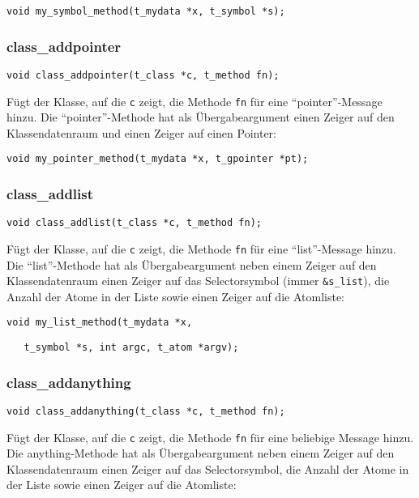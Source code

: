 \documentclass[12pt, a4paper,austrian, titlepage]{article}
\begin{document}
\begin{appendix}
\verb+void my_symbol_method(t_mydata *x, t_symbol *s);+

\subsubsection{class\_addpointer}
\begin{verbatim}
void class_addpointer(t_class *c, t_method fn);
\end{verbatim}
Fügt der Klasse, auf die \verb+c+ zeigt, die Methode \verb+fn+ 
für eine ``pointer''-Message hinzu.
Die ``pointer''-Methode hat als Übergabeargument einen Zeiger
auf den Klassendatenraum und einen Zeiger auf einen Pointer:

\verb+void my_pointer_method(t_mydata *x, t_gpointer *pt);+

\subsubsection{class\_addlist}
\begin{verbatim}
void class_addlist(t_class *c, t_method fn);
\end{verbatim}
Fügt der Klasse, auf die \verb+c+ zeigt, die Methode \verb+fn+ 
für eine ``list''-Message hinzu.
Die ``list''-Methode hat als Übergabeargument neben einem Zeiger
auf den Klassendatenraum einen Zeiger auf das Selectorsymbol
(immer \verb+&s_list+), 
die Anzahl der Atome in der Liste sowie einen Zeiger auf die Atomliste:

\verb+void my_list_method(t_mydata *x,+

\verb+   t_symbol *s, int argc, t_atom *argv);+





\subsubsection{class\_addanything}
\begin{verbatim}
void class_addanything(t_class *c, t_method fn);
\end{verbatim}
Fügt der Klasse, auf die \verb+c+ zeigt, die Methode \verb+fn+ 
für eine beliebige Message hinzu.
Die anything-Methode hat als Übergabeargument neben einem Zeiger
auf den Klassendatenraum einen Zeiger auf das Selectorsymbol, 
die Anzahl der Atome in der Liste sowie einen Zeiger auf die Atomliste:



\end{appendix}
\end{document}
